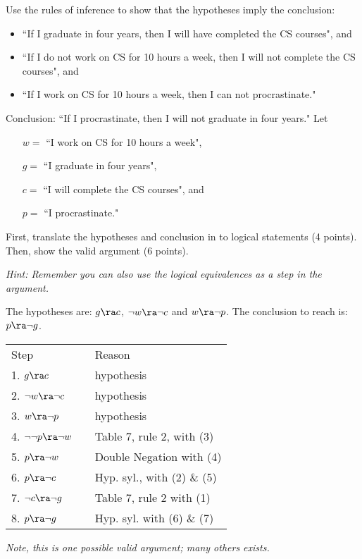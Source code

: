 \begin{questions}
\label{probc} Use the rules of inference to show that the hypotheses imply the conclusion:
\begin{itemize}[itemsep=0pt,parsep=0pt,topsep=0pt,partopsep=0pt]
    \item ``If I graduate in four years, then I will have completed the CS courses", and
    \item ``If I do not work on CS for 10 hours a week, then I will not complete the CS courses", and
    \item ``If I work on CS for 10 hours a week, then I can not procrastinate."
\end{itemize}
Conclusion: ``If I procrastinate, then I will not graduate in four years."
Let
\begin{itemize}[itemsep=0pt,parsep=0pt,topsep=0pt,partopsep=0pt]
    \item[$w = $] ``I work on CS for 10 hours a week",
    \item[$g = $] ``I graduate in four years",
    \item[$c = $] ``I will complete the CS courses", and
    \item[$p = $] ``I procrastinate."
\end{itemize}
First, translate the hypotheses and conclusion in to logical statements (4 points).  Then, show the valid argument (6 points).

\textit{Hint: Remember you can also use the logical equivalences as a step in the argument.}
    \ifprintanswers
        \vspace{-12pt}
    \fi
\begin{solution}
    The hypotheses are: $g \ra c$, $\neg w \ra \neg c$ and $w \ra \neg p$.
    The conclusion to reach is: $p \ra \neg g$.

    \begin{tabular}{lll}
        Step    & \hspace{0.2in} & Reason \\
        1. $g \ra c$                & & hypothesis \\
        2. $\neg w \ra \neg c$          & & hypothesis \\
        3. $w \ra \neg p$             & & hypothesis \\
        4. $\neg \neg p \ra \neg w$   & & Table 7, rule 2, with (3) \\
        5. $p \ra \neg w$       & & Double Negation with (4) \\
        6. $p \ra \neg c$               & & Hyp. syl., with (2) \& (5) \\
        7. $\neg c \ra \neg g$          & & Table 7, rule 2 with (1) \\
        8. $p \ra \neg g$       & & Hyp. syl. with (6) \& (7)
    \end{tabular}
    
    \emph{Note, this is one possible valid argument; many others exists.}
\end{solution}



\end{questions}
